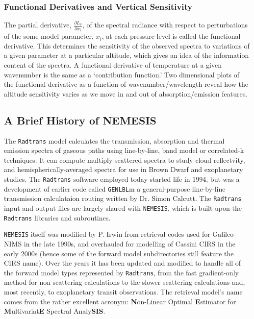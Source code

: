 \documentclass[final,5p,times,twocolumn,authoryear]{elsarticle}
\newcommand{\pderiv}[2]{\frac{\partial #1}{\partial #2}}
\begin{document}
\subsubsection{Functional Derivatives and Vertical Sensitivity}

The partial derivative, $\pderiv{L_\nu}{x_i}$, of the spectral radiance with respect to perturbations of the some model parameter, $x_i$, at each pressure level is called the functional derivative.  This determines the sensitivity of the observed spectra to variations of a given parameter at a particular altitude, which gives an idea of the information content of the spectra.  A functional derivative of temperature at a given wavenumber is the same as a `contribution function.'  Two dimensional plots of the functional derivative as a function of wavenumber/wavelength reveal how the altitude sensitivity varies as we move in and out of absorption/emission features.

\subsection{A Brief History of NEMESIS}

The \verb#Radtrans# model calculates the transmission, absorption and thermal emission spectra of gaseous paths using line-by-line, band model or correlated-k techniques.  It can compute multiply-scattered spectra to study cloud reflectvity, and hemispherically-averaged spectra for use in Brown Dwarf and exoplanetary studies.  The \verb#Radtrans# software employed today started life in 1994, but was a development of earlier code called \verb#GENLBL#m a general-purpose line-by-line transmission calculataion routing written by Dr. Simon Calcutt. The \verb#Radtrans# input and output files are largely shared with \verb#NEMESIS#, which is built upon the \verb#Radtrans# libraries and subroutines.

\verb#NEMESIS# itself was modified by P. Irwin from retrieval codes used for Galileo NIMS in the late 1990s, and overhauled for modelling of Cassini CIRS in the early 2000s (hence some of the forward model subdirectories still feature the CIRS name).  Over the years it has been updated and modified to handle all of the forward model types represented by \verb#Radtrans#, from the fast gradient-only method for non-scattering calculations to the slower scattering calculations and, most recently, to exoplanetary transit observations. The retrieval model's name comes from the rather excellent acronym:  \textbf{N}on-Linear Optimal \textbf{E}stimator for \textbf{M}ultivariat\textbf{E} Spectral Analy\textbf{SIS}.  
\end{document}
